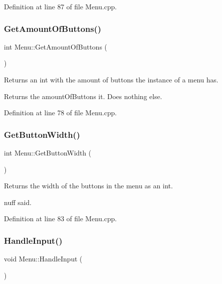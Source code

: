 Definition at line 87 of file Menu.\+cpp.

\mbox{\label{class_menu_a2b51455862ea3993a6dbd51ea5fe9f4d}} 
\subsubsection{\texorpdfstring{Get\+Amount\+Of\+Buttons()}{GetAmountOfButtons()}}
{\footnotesize\ttfamily int Menu\+::\+Get\+Amount\+Of\+Buttons (\begin{DoxyParamCaption}{ }\end{DoxyParamCaption})}



Returns an int with the amount of buttons the instance of a menu has. 

Returns the amount\+Of\+Buttons it. Does nothing else. 

Definition at line 78 of file Menu.\+cpp.

\mbox{\label{class_menu_a967d011a2868591943e2706750261878}} 
\subsubsection{\texorpdfstring{Get\+Button\+Width()}{GetButtonWidth()}}
{\footnotesize\ttfamily int Menu\+::\+Get\+Button\+Width (\begin{DoxyParamCaption}{ }\end{DoxyParamCaption})}



Returns the width of the buttons in the menu as an int. 

\textquotesingle{}nuff said. 

Definition at line 83 of file Menu.\+cpp.

\mbox{\label{class_menu_a0cb3596524ed7fd021f999860b563bf8}} 
\subsubsection{\texorpdfstring{Handle\+Input()}{HandleInput()}}
{\footnotesize\ttfamily void Menu\+::\+Handle\+Input (\begin{DoxyParamCaption}{ }\end{DoxyParamCaption})\hspace{0.3cm}{\ttfamily [virtual]}}



